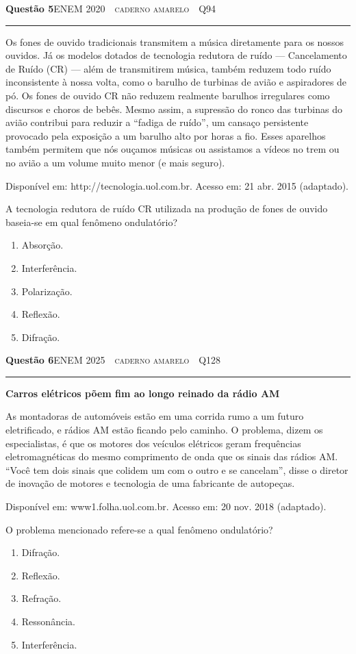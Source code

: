 \documentclass[11pt,a4paper]{article}
\newcommand{\fonte}[1]{{\small\scshape\color{grafite}#1}}
\newcommand{\enem}[3]{\fonte{ENEM #1 \,\textperiodcentered\, #2 \,\textperiodcentered\, Q#3}}
\newenvironment{questao}[2]{%
  \needspace{6\baselineskip}
  \par\addvspace{1.6em}
  {\large\bfseries\color{vinho}Quest\~ao #1}\hfill #2\\[-0.55em]
  {\color{black!25}\rule{\linewidth}{0.4pt}}
  \par\nobreak\smallskip
}{\par\addvspace{0.4em}}
\newcommand{\fontebib}[1]{{\raggedleft\scriptsize\color{grafite}#1\par}}
\begin{document}
\begin{questao}{5}{\enem{2020}{caderno amarelo}{94}}
Os fones de ouvido tradicionais transmitem a m\'usica diretamente para os
nossos ouvidos. J\'a os modelos dotados de tecnologia redutora de ru\'ido
--- Cancelamento de Ru\'ido (CR) --- al\'em de transmitirem m\'usica, tamb\'em
reduzem todo ru\'ido inconsistente \`a nossa volta, como o barulho de
turbinas de avi\~ao e aspiradores de p\'o. Os fones de ouvido CR n\~ao reduzem
realmente barulhos irregulares como discursos e choros de beb\^es. Mesmo
assim, a supress\~ao do ronco das turbinas do avi\~ao contribui para reduzir
a ``fadiga de ru\'ido'', um cansa\c{c}o persistente provocado pela exposi\c{c}\~ao
a um barulho alto por horas a fio. Esses aparelhos tamb\'em permitem que
n\'os ou\c{c}amos m\'usicas ou assistamos a v\'ideos no trem ou no avi\~ao a um
volume muito menor (e mais seguro).

\fontebib{Dispon\'ivel em: http://tecnologia.uol.com.br. Acesso em: 21 abr. 2015 (adaptado).}

A tecnologia redutora de ru\'ido CR utilizada na produ\c{c}\~ao de fones de
ouvido baseia-se em qual fen\^omeno ondulat\'orio?
\begin{enumerate}
  \item Absor\c{c}\~ao.
  \item Interfer\^encia.
  \item Polariza\c{c}\~ao.
  \item Reflex\~ao.
  \item Difra\c{c}\~ao.
\end{enumerate}
\end{questao}

\begin{questao}{6}{\enem{2025}{caderno amarelo}{128}}
{\centering\bfseries Carros el\'etricos p\~oem fim ao longo reinado da r\'adio AM\par}

As montadoras de autom\'oveis est\~ao em uma corrida rumo a um futuro
eletrificado, e r\'adios AM est\~ao ficando pelo caminho. O problema, dizem
os especialistas, \'e que os motores dos ve\'iculos el\'etricos geram
frequ\^encias eletromagn\'eticas do mesmo comprimento de onda que os sinais
das r\'adios AM. ``Voc\^e tem dois sinais que colidem um com o outro e se
cancelam'', disse o diretor de inova\c{c}\~ao de motores e tecnologia de uma
fabricante de autope\c{c}as.

\fontebib{Dispon\'ivel em: www1.folha.uol.com.br. Acesso em: 20 nov. 2018 (adaptado).}

O problema mencionado refere-se a qual fen\^omeno ondulat\'orio?
\begin{enumerate}
  \item Difra\c{c}\~ao.
  \item Reflex\~ao.
  \item Refra\c{c}\~ao.
  \item Resson\^ancia.
  \item Interfer\^encia.
\end{enumerate}
\end{questao}
\end{document}
